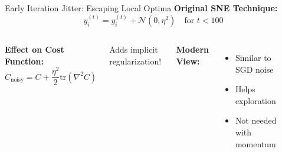 \begin{frame}{Early Iteration Jitter: Escaping Local Optima}
\textbf{Original SNE Technique:}
$$y_i^{(t)} = y_i^{(t)} + \mathcal{N}(0, \eta^2) \quad \text{for } t < 100$$

\begin{columns}
\textbf{Effect on Cost Function:}
$$C_{\text{noisy}} = C + \frac{\eta^2}{2}\text{tr}(\nabla^2 C)$$

Adds implicit regularization!

\textbf{Modern View:}
\begin{itemize}
\item Similar to SGD noise
\item Helps exploration
\item Not needed with momentum
\end{itemize}

\begin{center}
\end{center}
\end{columns}
\end{frame}

